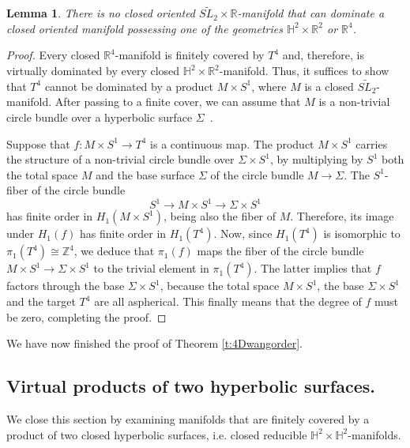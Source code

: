 \documentclass[12pt]{amsart}
\newtheorem{lem}[thm]{Lemma}
\theoremstyle{remark}
\begin{document}
\begin{lem}
 There is no closed oriented $\widetilde{SL_2} \times {\mathbb{R}}$-manifold that can dominate a closed oriented manifold possessing one of the geometries  $\mathbb{H}^2 \times {\mathbb{R}}^2$ or ${\mathbb{R}}^4$.
\end{lem}
\begin{proof}
Every closed ${\mathbb{R}}^4$-manifold is finitely covered by $T^4$ and, therefore, is virtually dominated by every closed $\mathbb{H}^2 \times {\mathbb{R}}^2$-manifold. Thus, it suffices to show that $T^4$ cannot be dominated by a product $M \times S^1$, where $M$ is a closed  $\widetilde{SL_2}$-manifold. After passing to a finite cover, we can assume that $M$ is a non-trivial circle bundle over a hyperbolic surface $\Sigma$~\cite{Scott:3-mfds}.

Suppose that $f \colon M \times S^1 \longrightarrow T^4$ is a continuous map. The product $M \times S^1$ carries the structure of a non-trivial circle bundle over $\Sigma \times S^1$, by multiplying by $S^1$ both the total space $M$ and the base surface $\Sigma$ of the circle bundle $M \longrightarrow \Sigma$. The $S^1$-fiber of the circle bundle 
\[
S^1\longrightarrow M \times S^1\longrightarrow \Sigma \times S^1
\]
has finite order in $H_1(M\times S^1)$, being also the fiber of $M$. Therefore, its image under $H_1(f)$ has finite order in $H_1(T^4)$. Now, since $H_1(T^4)$ is isomorphic to $\pi_1(T^4) \cong {\mathbb{Z}}^4$, we deduce that $\pi_1(f)$ maps the fiber of the circle bundle $M \times S^1 \longrightarrow \Sigma \times S^1$ to the trivial element in $\pi_1(T^4)$. The latter implies that $f$ factors through the base $\Sigma \times S^1$, because the total space $M \times S^1$, the base $\Sigma \times S^1$ and the target $T^4$ are all aspherical. This finally means that the degree of $f$ must be zero, completing the proof.
\end{proof}

We have now finished the proof of Theorem \ref{t:4Dwangorder}.

\subsection{Virtual products of two hyperbolic surfaces.}

We close this section by examining manifolds that are finitely covered by a product of two closed hyperbolic surfaces, i.e. closed reducible $\mathbb{H}^2 \times \mathbb{H}^2$-manifolds.
\end{document}
